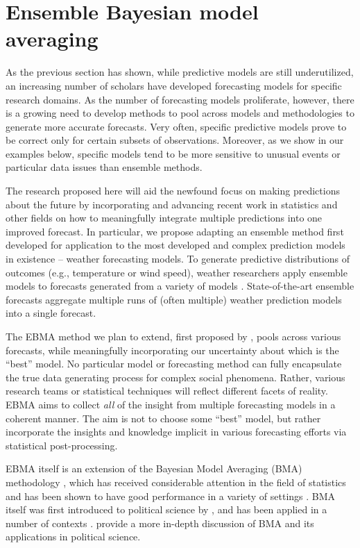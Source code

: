 \documentclass[pdftex,12pt,fullpage,oneside]{amsart}
\begin{document}
\setcounter{section}{1}

\section{Ensemble Bayesian model averaging} 

As the previous section has shown, while predictive models are still
underutilized, an increasing number of scholars have developed
forecasting models for specific research domains.  As the number of
forecasting models proliferate, however, there is a growing need to
develop methods to pool across models and methodologies to generate
more accurate forecasts.  Very often, specific predictive models prove
to be correct only for certain subsets of observations.  Moreover, as
we show in our examples below, specific models tend to be more
sensitive to unusual events or particular data issues than ensemble
methods.  

The research proposed here will aid the newfound focus on making
predictions about the future by incorporating and advancing recent
work in statistics and other fields on how to meaningfully integrate
multiple predictions into one improved forecast.  In particular, we
propose adapting an ensemble method first developed for application to
the most developed and complex prediction models in existence --
weather forecasting models.  To generate predictive distributions of
outcomes (e.g., temperature or wind speed), weather researchers apply
ensemble models to forecasts generated from a
variety of models \citep{Raftery:2005}.  State-of-the-art ensemble
forecasts aggregate multiple runs of (often multiple) weather
prediction models into a single forecast.

The EBMA method we plan to extend, first proposed by
\citet{Raftery:2005}, pools across various forecasts, while
meaningfully incorporating our uncertainty about which is the ``best''
model.  No particular model or forecasting method can fully
encapsulate the true data generating process for complex social
phenomena.  Rather, various research teams or statistical techniques
will reflect different facets of reality. EBMA aims to collect
\textit{all} of the insight from multiple forecasting models in a
coherent manner.  The aim is not to choose some ``best'' model, but
rather incorporate the insights and knowledge implicit in various
forecasting efforts via statistical post-processing.

EBMA itself is an extension of the Bayesian Model Averaging (BMA)
methodology \citep[c.f.,][]{Madigan:1994, Draper:1995, Raftery:1995,
  Hoeting:1999, Clyde:2003, Clyde:2004}, which has received
considerable attention in the field of statistics and has been shown
to have good performance in a variety of settings
\citep{Raftery:2003}. BMA itself was first introduced to political
science by \citet{Bartels:1997}, and has been applied in a number of
contexts \citep[e.g.,][]{Bartels:2001, Gill:2004, Imai:2004,
  Geer:2006b}. \citet{Montgomery:2010c} provide a more in-depth
discussion of BMA and its applications in political science.
\end{document}
